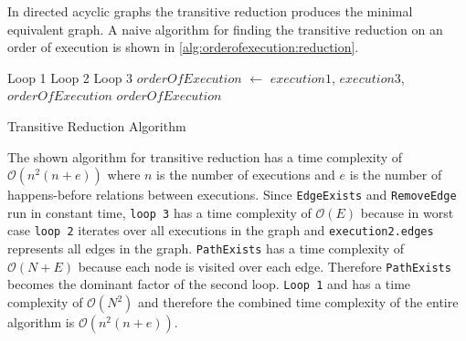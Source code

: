 	\newpar In directed acyclic graphs the transitive reduction produces the minimal equivalent graph. A naive algorithm for finding the transitive reduction on an order of execution is shown in \autoref{alg:orderofexecution:reduction}.
	
	\begin{algorithm}[H]
		\begin{algorithmic}
				\Comment Loop 1
					\Comment Loop 2
							\Comment Loop 3
									\State $orderOfExecution$ $\leftarrow$ \State \hspace{2em} {$execution1$, $execution3$, $orderOfExecution$}
								\EndIf
							\EndFor
						\EndIf
					\EndFor
				\EndFor
			\State
			\Return $orderOfExecution$
			\EndFunction
		\end{algorithmic}
		\caption{Transitive Reduction Algorithm}
		\label{alg:orderofexecution:reduction}
	\end{algorithm}
	
	\newpar The shown algorithm for transitive reduction has a time complexity of $\mathcal{O}(n^2(n+e))$ where $n$ is the number of executions and $e$ is the number of happens-before relations between executions. Since \texttt{EdgeExists} and \texttt{RemoveEdge} run in constant time, \texttt{loop 3} has a time complexity of $\mathcal{O}(E)$ because in worst case \texttt{loop 2} iterates over all executions in the graph and \texttt{execution2.edges} represents all edges in the graph. \texttt{PathExists} has a time complexity of $\mathcal{O}(N+E)$ because each node is visited over each edge. Therefore \texttt{PathExists} becomes the dominant factor of the second loop. \texttt{Loop 1} and  has a time complexity of $\mathcal{O}(N^2)$ and therefore the combined time complexity of the entire algorithm is $\mathcal{O}(n^2(n+e))$.
	
